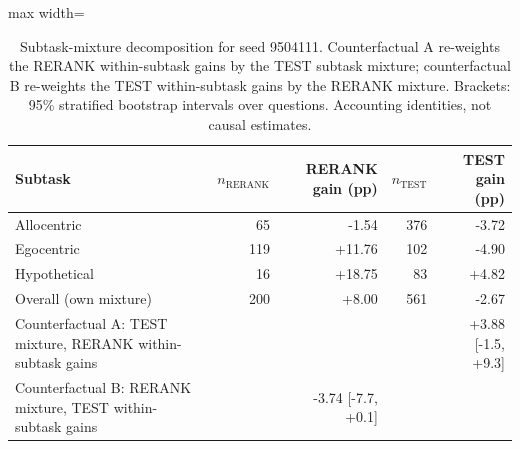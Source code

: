 \begin{table}[t]
\centering
\small
\begin{adjustbox}{max width=\linewidth}
\begin{tabular}{lrrrr}
\toprule
Subtask & $n_{\mathrm{RERANK}}$ & RERANK gain (pp) & $n_{\mathrm{TEST}}$ & TEST gain (pp) \\
\midrule
Allocentric & 65 & -1.54 & 376 & -3.72 \\
Egocentric & 119 & +11.76 & 102 & -4.90 \\
Hypothetical & 16 & +18.75 & 83 & +4.82 \\
\midrule
Overall (own mixture) & 200 & +8.00 & 561 & -2.67 \\
Counterfactual A: TEST mixture, RERANK within-subtask gains &  &  &  & +3.88 [-1.5, +9.3] \\
Counterfactual B: RERANK mixture, TEST within-subtask gains &  & -3.74 [-7.7, +0.1] &  &  \\
\bottomrule
\end{tabular}
\end{adjustbox}
\caption{Subtask-mixture decomposition for seed 9504111. Counterfactual A re-weights the RERANK within-subtask gains by the TEST subtask mixture; counterfactual B re-weights the TEST within-subtask gains by the RERANK mixture. Brackets: 95\% stratified bootstrap intervals over questions. Accounting identities, not causal estimates.}
\label{tab:shift}
\end{table}
